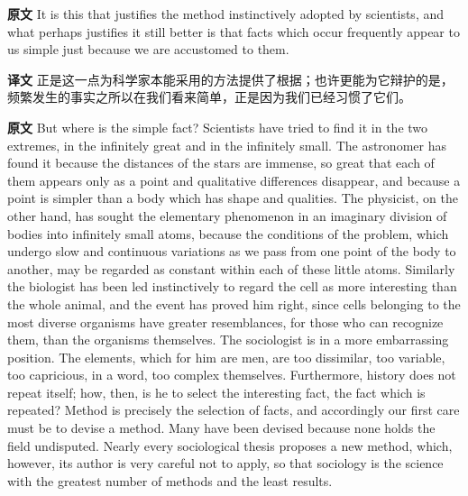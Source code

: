 \documentclass[UTF8,zihao=-4]{ctexart}
\newcommand{\BodyFont}{\fontsize{10.5pt}{15.5pt}\selectfont}
\newcommand{\origlabel}{\textbf{原文}\quad}
\newcommand{\translabel}{\textbf{译文}\quad}
\newenvironment{enblock}{\par\noindent\begingroup\BodyFont\origlabel}{\par\endgroup}
\newenvironment{zhblock}{\par\noindent\begingroup\BodyFont\translabel}{\par\endgroup\vspace{0.35em}}
\begin{document}
\begin{enblock}
It is this that justifies the method instinctively adopted by scientists, and what perhaps justifies it still better is that facts which occur frequently appear to us simple just because we are accustomed to them.
\end{enblock}
\begin{zhblock}
正是这一点为科学家本能采用的方法提供了根据；也许更能为它辩护的是，频繁发生的事实之所以在我们看来简单，正是因为我们已经习惯了它们。\end{zhblock}

\begin{enblock}
But where is the simple fact? Scientists have tried to find it in the two extremes, in the infinitely great and in the infinitely small. The astronomer has found it because the distances of the stars are immense, so great that each of them appears only as a point and qualitative differences disappear, and because a point is simpler than a body which has shape and qualities. The physicist, on the other hand, has sought the elementary phenomenon in an imaginary division of bodies into infinitely small atoms, because the conditions of the problem, which undergo slow and continuous variations as we pass from one point of the body to another, may be regarded as constant within each of these little atoms. Similarly the biologist has been led instinctively to regard the cell as more interesting than the whole animal, and the event has proved him right, since cells belonging to the most diverse organisms have greater resemblances, for those who can recognize them, than the organisms themselves. The sociologist is in a more embarrassing position. The elements, which for him are men, are too dissimilar, too variable, too capricious, in a word, too complex themselves. Furthermore, history does not repeat itself; how, then, is he to select the interesting fact, the fact which is repeated? Method is precisely the selection of facts, and accordingly our first care must be to devise a method. Many have been devised because none holds the field undisputed. Nearly every sociological thesis proposes a new method, which, however, its author is very careful not to apply, so that sociology is the science with the greatest number of methods and the least results.
\end{enblock}
\end{document}
